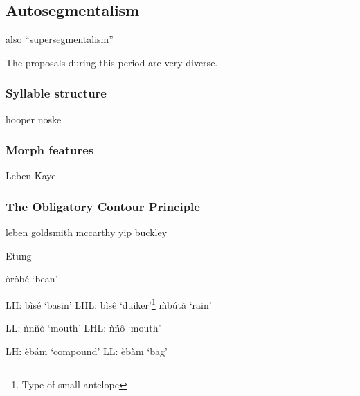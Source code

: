 \subsection{Autosegmentalism}

also ``supersegmentalism''

The proposals during this period are very diverse. 

\subsubsection{Syllable structure}

hooper
noske

\subsubsection{Morph features}

Leben
Kaye


\subsubsection{The Obligatory Contour Principle}

leben
goldsmith
mccarthy
yip
buckley

Etung 
\citet{Goldsmith1976}

\citet{Edmondson1966}


òròbé `bean'


LH: bìsé `basin' 
LHL: bìsê `duiker'\footnote{Type of small antelope} 
\`mbútà `rain'

LL: ǹnñò `mouth'
LHL: ǹñô `mouth'

LH: èbám `compound'
LL: èbàm `bag'

